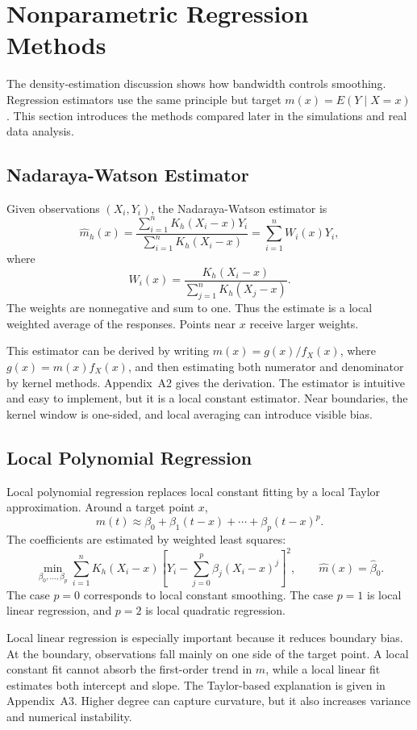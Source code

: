 \documentclass[12pt,a4paper]{article}
\begin{document}
\section{Nonparametric Regression Methods}
\label{sec:regression}

The density-estimation discussion shows how bandwidth controls smoothing. Regression estimators use the same principle but target \(m(x)=E(Y\mid X=x)\). This section introduces the methods compared later in the simulations and real data analysis.

\subsection{Nadaraya-Watson Estimator}

Given observations \((X_i,Y_i)\), the Nadaraya-Watson estimator is
\[
\hat m_h(x)=
\frac{\sum_{i=1}^n K_h(X_i-x)Y_i}
{\sum_{i=1}^n K_h(X_i-x)}
=\sum_{i=1}^n W_i(x)Y_i,
\]
where
\[
W_i(x)=
\frac{K_h(X_i-x)}
{\sum_{j=1}^n K_h(X_j-x)}.
\]
The weights are nonnegative and sum to one. Thus the estimate is a local weighted average of the responses. Points near \(x\) receive larger weights.

This estimator can be derived by writing \(m(x)=g(x)/f_X(x)\), where \(g(x)=m(x)f_X(x)\), and then estimating both numerator and denominator by kernel methods. Appendix~A2 gives the derivation. The estimator is intuitive and easy to implement, but it is a local constant estimator. Near boundaries, the kernel window is one-sided, and local averaging can introduce visible bias.

\subsection{Local Polynomial Regression}

Local polynomial regression replaces local constant fitting by a local Taylor approximation. Around a target point \(x\),
\[
m(t)\approx \beta_0+\beta_1(t-x)+\cdots+\beta_p(t-x)^p.
\]
The coefficients are estimated by weighted least squares:
\[
\min_{\beta_0,\ldots,\beta_p}
\sum_{i=1}^{n}K_h(X_i-x)
\left[
Y_i-\sum_{j=0}^{p}\beta_j(X_i-x)^j
\right]^2,
\qquad
\hat m(x)=\hat\beta_0.
\]
The case \(p=0\) corresponds to local constant smoothing. The case \(p=1\) is local linear regression, and \(p=2\) is local quadratic regression.

Local linear regression is especially important because it reduces boundary bias. At the boundary, observations fall mainly on one side of the target point. A local constant fit cannot absorb the first-order trend in \(m\), while a local linear fit estimates both intercept and slope. The Taylor-based explanation is given in Appendix~A3. Higher degree can capture curvature, but it also increases variance and numerical instability.
\end{document}
